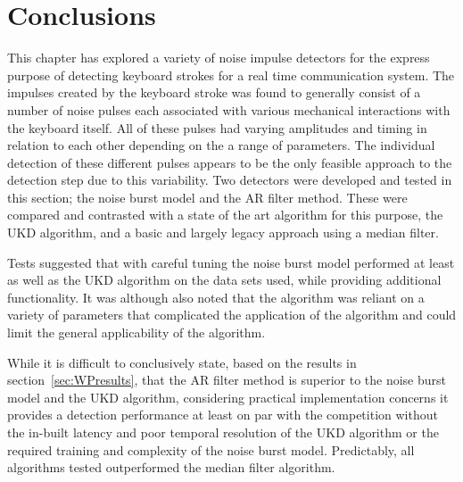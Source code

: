 \section{Conclusions}\label{sec:WPconclusions}

This chapter has explored a variety of noise impulse detectors for the express purpose of detecting keyboard strokes for a real time communication system. The impulses created by the keyboard stroke was found to generally consist of a number of noise pulses each associated with various mechanical interactions with the keyboard itself. All of these pulses had varying amplitudes and timing in relation to each other depending on the a range of parameters. The individual detection of these different pulses appears to be the only feasible approach to the detection step due to this variability. Two detectors were developed and tested in this section; the noise burst model and the AR filter method. These were compared and contrasted with a state of the art algorithm for this purpose, the UKD algorithm\cite{Subramanya2007}, and a basic and largely legacy approach using a median filter.

Tests suggested that with careful tuning the noise burst model performed at least as well as the UKD algorithm on the data sets used, while providing additional functionality. It was although also noted that the algorithm was reliant on a variety of parameters that complicated the application of the algorithm and could limit the general applicability of the algorithm.

While it is difficult to conclusively state, based on the results in section~\ref{sec:WPresults}, that the AR filter method is superior to the noise burst model and the UKD algorithm, considering practical implementation concerns it provides a detection performance at least on par with the competition without the in-built latency and poor temporal resolution of the UKD algorithm or the required training and complexity of the noise burst model. Predictably, all algorithms tested outperformed the median filter algorithm.


